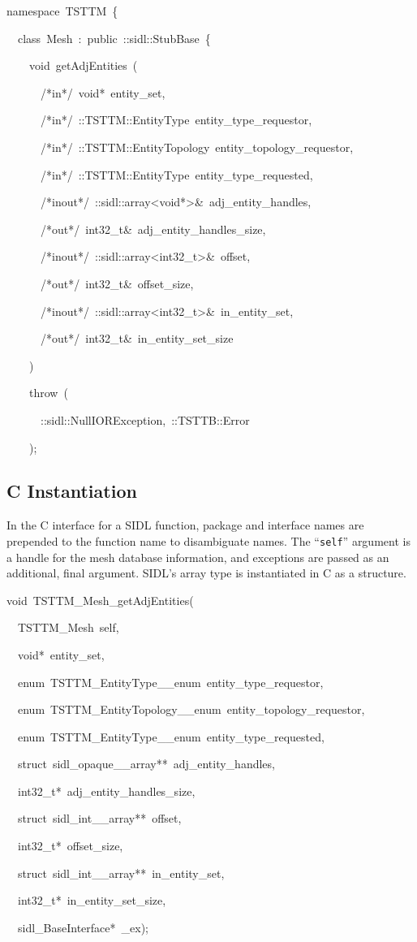 \begin{lyxcode}
namespace~TSTTM~\{

~~class~Mesh~:~public~::sidl::StubBase~\{~

~~~~void~getAdjEntities~(

~~~~~~/{*}in{*}/~void{*}~entity\_set,

~~~~~~/{*}in{*}/~::TSTTM::EntityType~entity\_type\_requestor,

~~~~~~/{*}in{*}/~::TSTTM::EntityTopology~entity\_topology\_requestor,

~~~~~~/{*}in{*}/~::TSTTM::EntityType~entity\_type\_requested,

~~~~~~/{*}inout{*}/~::sidl::array<void{*}>\&~adj\_entity\_handles,

~~~~~~/{*}out{*}/~int32\_t\&~adj\_entity\_handles\_size,

~~~~~~/{*}inout{*}/~::sidl::array<int32\_t>\&~offset,

~~~~~~/{*}out{*}/~int32\_t\&~offset\_size,

~~~~~~/{*}inout{*}/~::sidl::array<int32\_t>\&~in\_entity\_set,

~~~~~~/{*}out{*}/~int32\_t\&~in\_entity\_set\_size

~~~~)

~~~~throw~(~

~~~~~~::sidl::NullIORException,~::TSTTB::Error

~~~~);


\end{lyxcode}

\subsection*{C Instantiation}

In the C interface for a SIDL function, package and interface names
are prepended to the function name to disambiguate names. The {}``\texttt{self}''
argument is a handle for the mesh database information, and exceptions
are passed as an additional, final argument. SIDL's array type is
instantiated in C as a structure.

\begin{lyxcode}
void~TSTTM\_Mesh\_getAdjEntities(

~~TSTTM\_Mesh~self,

~~void{*}~entity\_set,

~~enum~TSTTM\_EntityType\_\_enum~entity\_type\_requestor,

~~enum~TSTTM\_EntityTopology\_\_enum~entity\_topology\_requestor,

~~enum~TSTTM\_EntityType\_\_enum~entity\_type\_requested,

~~struct~sidl\_opaque\_\_array{*}{*}~adj\_entity\_handles,

~~int32\_t{*}~adj\_entity\_handles\_size,

~~struct~sidl\_int\_\_array{*}{*}~offset,

~~int32\_t{*}~offset\_size,

~~struct~sidl\_int\_\_array{*}{*}~in\_entity\_set,

~~int32\_t{*}~in\_entity\_set\_size,

~~sidl\_BaseInterface{*}~\_ex);
\end{lyxcode}

